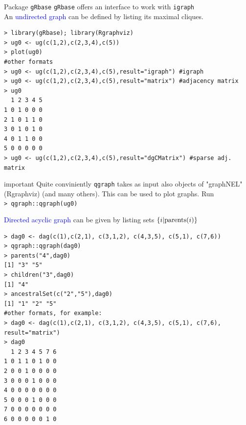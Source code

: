 \documentclass[dvipsnames,aspectratio=169]{beamer} %
\begin{document}
\begin{frame}[fragile]{Package \texttt{gRbase}}
\texttt{gRbase} offers an interface to work with \texttt{igraph}\\[.2cm]
An \textcolor{blue}{undirected graph} can be defined by listing its \alert{maximal cliques}.
\begin{lstlisting}
> library(gRbase); library(Rgraphviz)
> ug0 <- ug(c(1,2),c(2,3,4),c(5))
> plot(ug0)
#other formats
> ug0 <- ug(c(1,2),c(2,3,4),c(5),result="igraph") #igraph
> ug0 <- ug(c(1,2),c(2,3,4),c(5),result="matrix") #adjacency matrix
> ug0
  1 2 3 4 5
1 0 1 0 0 0
2 1 0 1 1 0
3 0 1 0 1 0
4 0 1 1 0 0
5 0 0 0 0 0
> ug0 <- ug(c(1,2),c(2,3,4),c(5),result="dgCMatrix") #sparse adj. matrix
\end{lstlisting}
\begin{beamercolorbox}[wd=\paperwidth,sep=5pt]{important}
	{\small Quite conviniently \texttt{qgraph} takes as input also objects of  "graphNEL" (Rgraphviz) (and many others). This can be used to plot graphs. Run\\ \texttt{> qgraph::qgraph(ug0)}}
\end{beamercolorbox}
\end{frame}

\begin{frame}[fragile]{}
	\textcolor{blue}{Directed acyclic graph} can be given by listing sets $\{i|{\rm parents}(i)\}$
\begin{lstlisting}
> dag0 <- dag(c(1),c(2,1), c(3,1,2), c(4,3,5), c(5,1), c(7,6))
> qgraph::qgraph(dag0)
> parents("4",dag0)
[1] "3" "5"
> children("3",dag0)
[1] "4"
> ancestralSet(c("2","5"),dag0)
[1] "1" "2" "5"
#other formats, for example:
> dag0 <- dag(c(1),c(2,1), c(3,1,2), c(4,3,5), c(5,1), c(7,6), result="matrix") 
> dag0
  1 2 3 4 5 7 6
1 0 1 1 0 1 0 0
2 0 0 1 0 0 0 0
3 0 0 0 1 0 0 0
4 0 0 0 0 0 0 0
5 0 0 0 1 0 0 0
7 0 0 0 0 0 0 0
6 0 0 0 0 0 1 0\end{lstlisting}
\end{frame}

\end{document}
